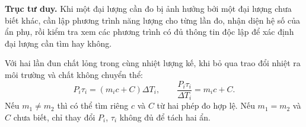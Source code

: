 
\begin{dang}
\textbf{Trục tư duy.} Khi một đại lượng cần đo bị ảnh hưởng bởi một đại lượng chưa biết khác, cần lập phương trình năng lượng cho từng lần đo, nhận diện hệ số của ẩn phụ, rồi kiểm tra xem các phương trình có đủ thông tin độc lập để xác định đại lượng cần tìm hay không.

Với hai lần đun chất lỏng trong cùng nhiệt lượng kế, khi bỏ qua trao đổi nhiệt ra môi trường và chất không chuyển thể:
\[
P_i\tau_i=(m_ic+C)\Delta T_i,\qquad
\frac{P_i\tau_i}{\Delta T_i}=m_ic+C.
\]
Nếu $m_1\ne m_2$ thì có thể tìm riêng $c$ và $C$ từ hai phép đo hợp lệ. Nếu $m_1=m_2$ và $C$ chưa biết, chỉ thay đổi $P_i$, $\tau_i$ không đủ để tách hai ẩn.
\end{dang}


